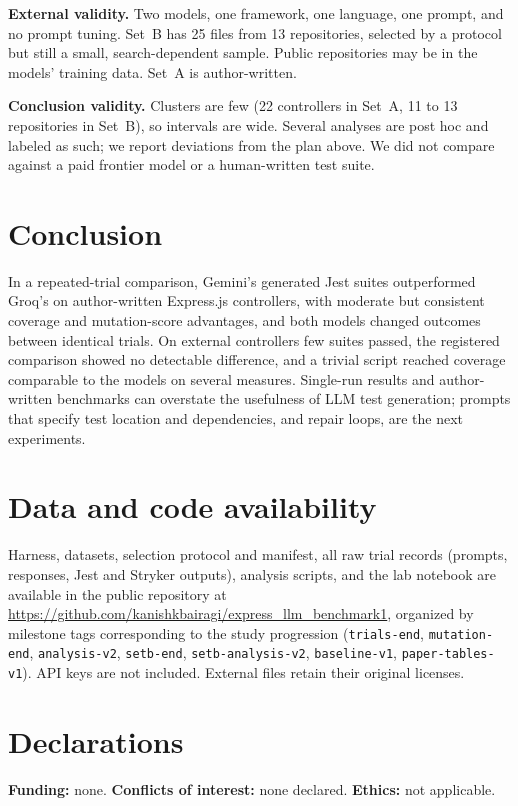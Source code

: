 \documentclass[sigconf]{acmart}
\begin{document}
\textbf{External validity.} Two models, one framework, one language, one prompt, and no prompt tuning. Set~B has 25 files from 13 repositories, selected by a protocol but still a small, search-dependent sample. Public repositories may be in the models' training data. Set~A is author-written.

\textbf{Conclusion validity.} Clusters are few (22 controllers in Set~A, 11 to 13 repositories in Set~B), so intervals are wide. Several analyses are post hoc and labeled as such; we report deviations from the plan above. We did not compare against a paid frontier model or a human-written test suite.

\section{Conclusion}
In a repeated-trial comparison, Gemini's generated Jest suites outperformed Groq's on author-written Express.js controllers, with moderate but consistent coverage and mutation-score advantages, and both models changed outcomes between identical trials. On external controllers few suites passed, the registered comparison showed no detectable difference, and a trivial script reached coverage comparable to the models on several measures. Single-run results and author-written benchmarks can overstate the usefulness of LLM test generation; prompts that specify test location and dependencies, and repair loops, are the next experiments.

\section*{Data and code availability}
Harness, datasets, selection protocol and manifest, all raw trial records (prompts, responses, Jest and Stryker outputs), analysis scripts, and the lab notebook are available in the public repository at \url{https://github.com/kanishkbairagi/express_llm_benchmark1}, organized by milestone tags corresponding to the study progression (\texttt{trials-end}, \texttt{mutation-end}, \texttt{analysis-v2}, \texttt{setb-end}, \texttt{setb-analysis-v2}, \texttt{baseline-v1}, \texttt{paper-tables-v1}). API keys are not included. External files retain their original licenses.

\section*{Declarations}
\textbf{Funding:} none. \textbf{Conflicts of interest:} none declared. \textbf{Ethics:} not applicable.
\end{document}

